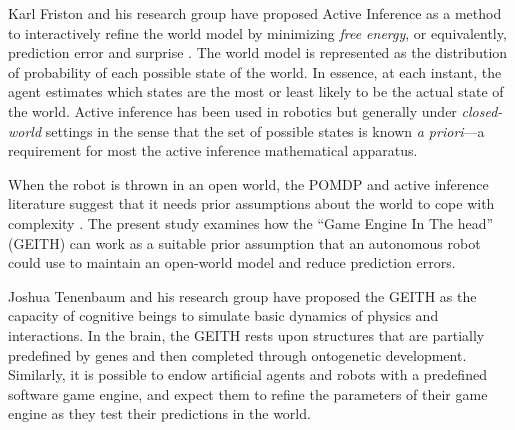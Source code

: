 \documentclass[runningheads]{llncs}
\begin{document}
Karl Friston and his research group have proposed Active Inference \cite[e.g.]{smith_step-by-step_2022} as a method to interactively refine the world model by minimizing \textit{free energy}, or equivalently, prediction error and surprise \cite{friston_free-energy_2010}.
The world model %
is represented as the distribution of probability %
of each possible state of the world. 
In essence, at each instant, the agent estimates which states are the most or least likely to be the actual state of the world.
Active inference has been used in robotics \cite{lanillos_active_2021} but generally under \textit{closed-world} settings in the sense that the set of possible states is known \textit{a priori}---a requirement for most the active inference mathematical apparatus. 

When the robot is thrown in an open world, 
the POMDP and active inference literature suggest that it needs prior assumptions about the world to cope with complexity \cite{georgeon_artificial_2024}. 
The present study examines how the ``Game Engine In The head'' (GEITH) can work as a suitable prior assumption that an autonomous robot could use to maintain an open-world model and reduce prediction errors. 

Joshua Tenenbaum and his research group have proposed the GEITH \cite{battaglia_simulation_2013} as the capacity of cognitive beings to simulate basic dynamics of physics and interactions. 
In the brain, the GEITH rests upon structures that are partially predefined by genes and then completed through ontogenetic development.  
Similarly, it is possible to endow artificial agents and robots with a predefined software game engine, and expect them to refine the parameters of their game engine as they test their predictions in the world.
\end{document}
